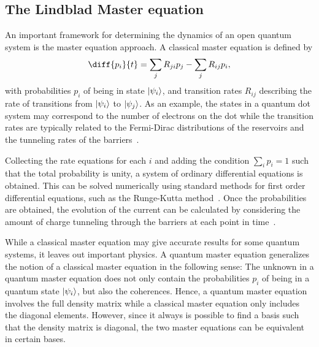 \documentclass[../main.tex]{subfiles}
\begin{document}
\subsection{The Lindblad Master equation}\label{sec:lind}
An important framework for determining the dynamics of an open quantum system is the master equation approach. A classical master equation is defined by
\begin{equation}\label{master}
    \diff{p_i}{t} = \sum_j R_{ji}p_j  - \sum_j R_{ij}p_i,
\end{equation}
with probabilities $p_i$ of being in state $\ket{\psi_i}$, and transition rates $R_{ij}$ describing the rate of transitions from $\ket{\psi_i}$ to $\ket{\psi_j}$. As an example, the states in a quantum dot system may correspond to the number of electrons on the dot while the transition rates are typically related to the Fermi-Dirac distributions of the reservoirs and the tunneling rates of the barriers~\cite{transport}.

Collecting the rate equations for each $i$ and adding the condition $\sum_i p_i = 1$ such that the total probability is unity, a system of ordinary differential equations is obtained. This can be solved numerically using standard methods for first order differential equations, such as the Runge-Kutta method~\cite{iserles}. Once the probabilities are obtained, the evolution of the current can be calculated by considering the amount of charge tunneling through the barriers at each point in time~\cite{transport}.

While a classical master equation may give accurate results for some quantum systems, it leaves out important physics. A quantum master equation generalizes the notion of a classical master equation in the following sense: The unknown in a quantum master equation does not only contain the probabilities $p_i$ of being in a quantum state $\ket{\psi_i}$, but also the coherences. Hence, a quantum master equation involves the full density matrix while a classical master equation only includes the diagonal elements. However, since it always is possible to find a basis such that the density matrix is diagonal, the two master equations can be equivalent in certain bases.
\end{document}
